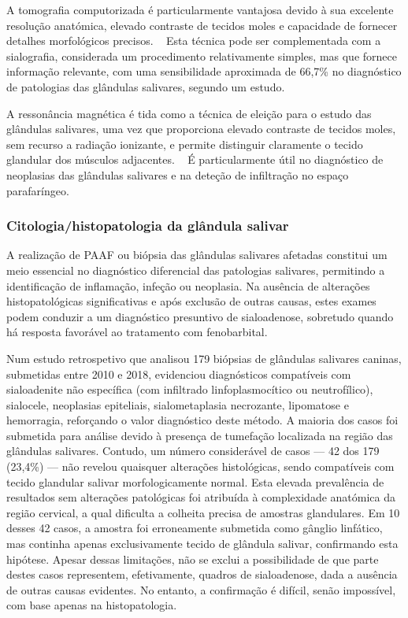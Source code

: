A tomografia computorizada é particularmente vantajosa devido à sua excelente resolução anatómica, elevado contraste de tecidos moles e capacidade de fornecer detalhes morfológicos precisos. ~\cite{gil_anatomic_2018} Esta técnica pode ser complementada com a sialografia, considerada um procedimento relativamente simples, mas que fornece informação relevante, com uma sensibilidade aproximada de 66,7\% no diagnóstico de patologias das glândulas salivares, segundo um estudo. ~\cite{seiler_acvr_2022,kneissl_ct_2011}


A ressonância magnética é tida como a técnica de eleição para o estudo das glândulas salivares, uma vez que proporciona elevado contraste de tecidos moles, sem recurso a radiação ionizante, e permite distinguir claramente o tecido glandular dos músculos adjacentes. ~\cite{gil_anatomic_2018} É particularmente útil no diagnóstico de neoplasias das glândulas salivares e na deteção de infiltração no espaço parafaríngeo. ~\cite{gil_anatomic_2018}


\subsubsection{Citologia/histopatologia da glândula salivar}


A realização de PAAF ou biópsia das glândulas salivares afetadas constitui um meio essencial no diagnóstico diferencial das patologias salivares, permitindo a identificação de inflamação, infeção ou neoplasia. Na ausência de alterações histopatológicas significativas e após exclusão de outras causas, estes exames podem conduzir a um diagnóstico presuntivo de sialoadenose, sobretudo quando há resposta favorável ao tratamento com fenobarbital.


Num estudo retrospetivo que analisou 179 biópsias de glândulas salivares caninas, submetidas entre 2010 e 2018, evidenciou diagnósticos compatíveis com sialoadenite não específica (com infiltrado linfoplasmocítico ou neutrofílico), sialocele, neoplasias epiteliais, sialometaplasia necrozante, lipomatose e hemorragia, reforçando o valor diagnóstico deste método. A maioria dos casos foi submetida para análise devido à presença de tumefação localizada na região das glândulas salivares. Contudo, um número considerável de casos — 42 dos 179 (23,4\%) — não revelou quaisquer alterações histológicas, sendo compatíveis com tecido glandular salivar morfologicamente normal. Esta elevada prevalência de resultados sem alterações patológicas foi atribuída à complexidade anatómica da região cervical, a qual dificulta a colheita precisa de amostras glandulares. Em 10 desses 42 casos, a amostra foi erroneamente submetida como gânglio linfático, mas continha apenas exclusivamente tecido de glândula salivar, confirmando esta hipótese.
Apesar dessas limitações, não se exclui a possibilidade de que parte destes casos representem, efetivamente, quadros de sialoadenose, dada a ausência de outras causas evidentes. No entanto, a confirmação é difícil, senão impossível, com base apenas na histopatologia.


